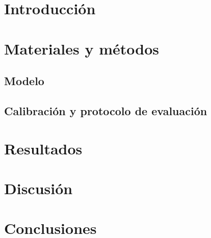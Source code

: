 \documentclass[11pt,a4paper]{article}
\begin{document}
\section{Introducci\'on}
\label{sec:intro}


\section{Materiales y m\'etodos}
\label{sec:metodos}



\subsection{Modelo}
\label{sec:modelo}



\subsection{Calibraci\'on y protocolo de evaluaci\'on}
\label{sec:calibracion}


\section{Resultados}
\label{sec:resultados}


\section{Discusi\'on}
\label{sec:discusion}


\section{Conclusiones}
\label{sec:conclusiones}




\printbibliography
\end{document}
